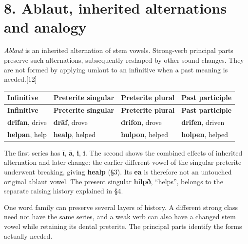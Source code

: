 \section*{8. Ablaut, inherited alternations and analogy}
\emph{Ablaut} is an inherited alternation of stem vowels. Strong-verb principal parts preserve such alternations, subsequently reshaped by other sound changes. They are not formed by applying umlaut to an infinitive when a past meaning is needed.[12]\par
\begingroup
\fontsize{10.5}{13.2}\selectfont
\setlength{\LTleft}{0pt}
\setlength{\LTright}{0pt plus 1fil}
\begin{longtable}{@{}>{\raggedright\arraybackslash}p{}>{\raggedright\arraybackslash}p{}>{\raggedright\arraybackslash}p{}>{\raggedright\arraybackslash}p{}@{}}
\toprule
\textbf{Infinitive} & \textbf{Preterite singular} & \textbf{Preterite plural} & \textbf{Past participle} \\
\midrule
\endfirsthead
\toprule
\textbf{Infinitive} & \textbf{Preterite singular} & \textbf{Preterite plural} & \textbf{Past participle} \\
\midrule
\endhead
\bottomrule
\endfoot
\bottomrule
\endlastfoot
\textbf{drīfan}, drive & \textbf{drāf}, drove & \textbf{drifon}, drove & \textbf{drifen}, driven \\
\textbf{helpan}, help & \textbf{healp}, helped & \textbf{hulpon}, helped & \textbf{holpen}, helped \\
\end{longtable}
\endgroup
The first series has \textbf{ī}, \textbf{ā}, \textbf{i}, \textbf{i}. The second shows the combined effects of inherited alternation and later change: the earlier different vowel of the singular preterite underwent breaking, giving \textbf{healp} (§3). Its \textbf{ea} is therefore not an untouched original ablaut vowel. The present singular \textbf{hilpð}, “helps”, belongs to the separate raising history explained in §4.\par
One word family can preserve several layers of history. A different strong class need not have the same series, and a weak verb can also have a changed stem vowel while retaining its dental preterite. The principal parts identify the forms actually needed.\par
